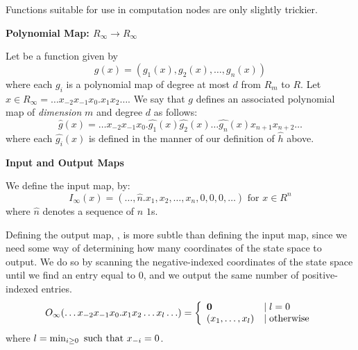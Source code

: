   Functions suitable for use in computation nodes are only slightly
  trickier.  
  
  \begin{definition}{\textbf{Polynomial Map: $R_\infty \rightarrow R_\infty$}}
    
    Let  be a function given by $$g(x) =
    (g_1(x), g_2(x), \ldots , g_n(x))$$ where each $g_i$ is a
    polynomial map of degree at most $d$ from $R_m$ to $R$.  Let $x
    \in R_\infty = \ldots x_{-2}x_{-1}x_0.x_1x_2 \ldots$. We say that
    $g$ defines an associated polynomial map
     of \emph{dimension} $m$
    and degree $d$ as follows:
    $$\widehat{g}(x) = 
    \ldots x_{-2}x_{-1}x_0.
    \widehat{g_1}(x)\widehat{g_2}(x)\ldots\widehat{g_n}(x)x_{n+1}x_{n+2}\ldots$$
    where each $\widehat{g_i}(x)$ is defined in the manner of our
    definition of $\widehat{h}$ above.
  \end{definition}
  
  \begin{definition} \textbf{Input and Output Maps}
    
    We define the input map, 
    by:
    $$I_\infty(x) = 
    (\ldots, \widehat{n}.x_1,x_2,\ldots,x_n, 0,0,0,\ldots) \text{ for }
    x \in R^n$$ where $\widehat{n}$ denotes a sequence of $n$ $1$s.
    
    Defining the output map, ,
    is more subtle than defining the input map, since we need some way
    of determining how many coordinates of the state space to output.
    We do so by scanning the negative-indexed coordinates of the state
    space until we find an entry equal to $0$, and we output the same
    number of positive-indexed entries.
    $$O_\infty(\ldots x_{-2}x_{-1}x_0.x_1x_2\ldots x_l \ldots ) = 
    \left\{ \begin{array}{ll} \mathbf{0} & \mid l = 0 \\ (x_1, \ldots, x_l) & \mid \text{otherwise} \end{array} \right.
    $$
    where $l = \min_{i \geq 0} \text{ such that } x_{-i} = 0$.  
  \end{definition}

